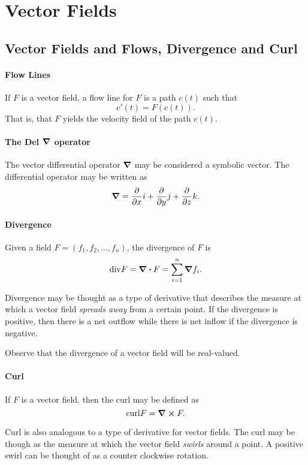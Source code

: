 \section{Vector Fields}

\subsection{Vector Fields and Flows, Divergence and Curl}
\paragraph{Flow Lines}
If \(F\) is a vector field, a flow line for \(F\) is a path \(c(t)\)
such that
\[c'(t) = F(c(t)).\]
That is, that \(F\) yields the velocity field of the path \(c(t)\).

\paragraph{The Del \(\grad\) operator}
The vector differential operator \(\grad\) may be considered a 
symbolic vector.
The differential operator may be written as 
\[\grad = \frac{\partial}{\partial x}i + \frac{\partial}{\partial y}j + \frac{\partial}{\partial z}k.\]

\paragraph{Divergence}
Given a field \(F = (f_1, f_2, \dots, f_n)\), the divergence of \(F\) is
\[\text{div} F = \div F = \sum_{i=1}^n \grad f_i.\]

Divergence may be thought as a type of derivative that describes the measure at which 
a vector field \textit{spreads away} from a certain point.
If the divergence is positive, then there is a net outflow while there is net inflow if the divergence is negative.

Observe that the divergence of a vector field will be real-valued.

\paragraph{Curl}
If \(F\) is a vector field, then the curl may be defined as
\[\mathrm{curl}F = \curl F.\]

Curl is also analogous to a type of derivative for vector fields. The curl may be though as the measure at which the vector field \textit{swirls} around a point.
A positive swirl can be thought of as a counter clockwise rotation.

